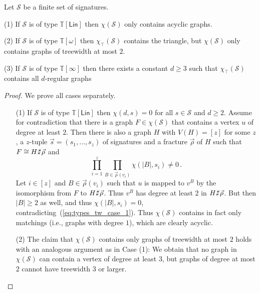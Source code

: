 \documentclass[authorcolumns,numberwithinsect]{no-lipics-v2022}
\newcommand{\homsupp}{\chi}
\def\fracture#1#2{\ensuremath{#1\raisebox{.2ex}{\rotatebox[origin=c]{-15}{$\sharp$}}#2}}
\def\fracture#1#2{\ensuremath{#1\raisebox{.2ex}{\rotatebox[origin=c]{-15}{$\sharp$}}#2}}
\begin{document}
\begin{lemma}\label{lem:hom_support_characterisation}
    Let $\mathcal{S}$ be a finite set of signatures. 
    \item[(1)] If $\mathcal{S}$ is of type $\mathbb{T}[\mathsf{Lin}]$ then $\homsupp(\mathcal{S})$ only contains acyclic graphs.
    \item[(2)] If $\mathcal{S}$ is of type $\mathbb{T}[\omega]$ then $\homsupp_\top(\mathcal{S})$ contains the triangle, but $\homsupp(\mathcal{S})$ only contains graphs of treewidth at most $2$.
    \item[(3)] If $\mathcal{S}$ is of type $\mathbb{T}[\infty]$ then there exists a constant $d\geq 3$ such that $\homsupp_\top(\mathcal{S})$ contains all $d$-regular graphs
\end{lemma}
\begin{proof}
    We prove all cases separately.
    \begin{itemize}
        \item[(1)] If $\mathcal{S}$ is of type $\mathbb{T}[\mathsf{Lin}]$ then $\chi(d,s)=0$ for all $s\in \mathcal{S}$ and $d\geq 2$. Assume for contradiction that there is a graph $F\in \homsupp(\mathcal{S})$ that contains a vertex $u$ of degree at least $2$. Then there is also a graph $H$ with $V(H)=[z]$ for some $z$, a $z$-tuple $\vec{s}=(s_1,\dots,s_z)$ of signatures and a fracture $\vec{\rho}$ of $H$ such that $F \cong \fracture{H}{\vec{\rho}}$ and
        \begin{equation}\label{eq:types_tw_case_1}
            \prod_{i=1}^z \prod_{B\in \vec{\rho}(v_i)} \chi(|B|,s_i)\neq 0\,.
        \end{equation}
        Let $i\in [z]$ and $B \in \vec{\rho}(v_i)$ such that $u$ is mapped to $v^B$ by the isomorphism from $F$ to $\fracture{H}{\vec{\rho}}$. Thus $v^B$ has degree at least $2$ in $\fracture{H}{\vec{\rho}}$. But then $|B|\geq 2$ as well, and thus $\chi(|B|,s_i)=0$, contradicting~(\ref{eq:types_tw_case_1}). 
        Thus $\homsupp(\mathcal{S})$ contains in fact only matchings (i.e., graphs with degree $1$), which are clearly acyclic.
        \item[(2)] The claim that $\homsupp(\mathcal{S})$ contains only graphs of treewidth at most $2$ holds with an analogous argument as in Case (1): We obtain that no graph in $\homsupp(\mathcal{S})$ can contain a vertex of degree at least $3$, but graphs of degree at most $2$ cannot have treewidth $3$ or larger. 


\end{itemize}
\end{proof}
\end{document}
